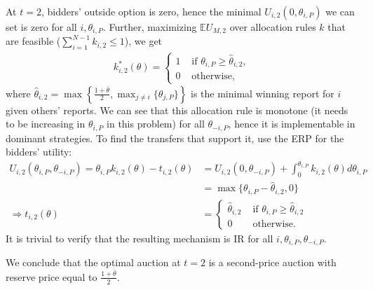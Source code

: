 \documentclass[a4paper]{article}
\begin{document}
\begin{enumerate}
		At $t=2$, bidders' outside option is zero, hence the minimal $U_{i,2}(0,\theta_{i,P})$ we can set is zero for all $i,\theta_{i,P}$. Further, maximizing $\mathbb{E}U_{M,2}$ over allocation rules $k$ that are feasible ($\sum_{i=1}^{N-1}k_{i,2} \leq 1$), we get
		\begin{align*}
			k_{i,2}^*(\theta) = \begin{cases}
				1 & \text{ if } \theta_{i,P} \geq \hat{\theta}_{i,2},
				\\
				0 & \text{ otherwise},
			\end{cases}
		\end{align*}
		where $\hat{\theta}_{i,2} = \max \left\{\frac{1+\bar{\theta}}{2}, \max_{j \neq i} \{ \theta_{j,P} \} \right\}$ is the minimal winning report for $i$ given others' reports.
		We can see that this allocation rule is monotone (it needs to be increasing in $\theta_{i,P}$ in this problem) for all $\theta_{-i,P}$, hence it is implementable in dominant strategies. To find the transfers that support it, use the ERP for the bidders' utility: 
		\begin{align*}
			U_{i,2}(\theta_{i,P},\theta_{-i,P}) = \theta_{i,P} k_{i,2}(\theta) - t_{i,2}(\theta) &= U_{i,2}(0,\theta_{-i,P}) + \int_0^{\theta_{i,P}} k_{i,2}(\theta) d\theta_{i,P}
			\\
			&= \max \{ \theta_{i,P} - \hat{\theta}_{i,2}, 0 \}
			\\
			\Rightarrow t_{i,2}(\theta) &= \begin{cases}
				\hat{\theta}_{i,2} & \text{ if } \theta_{i,P} \geq \hat{\theta}_{i,2}
				\\
				0 & \text{ otherwise}.
			\end{cases}
		\end{align*}
		It is trivial to verify that the resulting mechanism is IR for all $i,\theta_{i,P},\theta_{-i,P}$.
		
		We conclude that the optimal auction at $t=2$ is a second-price auction with reserve price equal to $\frac{1+\bar{\theta}}{2}$. 
		

\end{enumerate}
\end{document}
